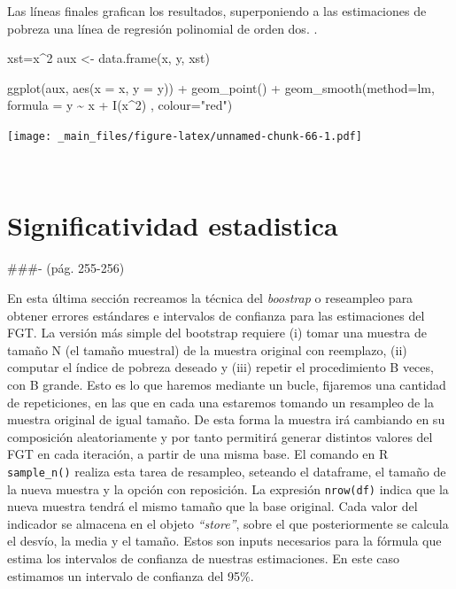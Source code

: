\documentclass[
]{book}
\newenvironment{Shaded}{\begin{snugshade}}{\end{snugshade}}
\newcommand{\AttributeTok}[1]{\textcolor[rgb]{0.77,0.63,0.00}{#1}}
\newcommand{\DecValTok}[1]{\textcolor[rgb]{0.00,0.00,0.81}{#1}}
\newcommand{\FunctionTok}[1]{\textcolor[rgb]{0.00,0.00,0.00}{#1}}
\newcommand{\NormalTok}[1]{#1}
\newcommand{\OtherTok}[1]{\textcolor[rgb]{0.56,0.35,0.01}{#1}}
\newcommand{\SpecialCharTok}[1]{\textcolor[rgb]{0.00,0.00,0.00}{#1}}
\newcommand{\StringTok}[1]{\textcolor[rgb]{0.31,0.60,0.02}{#1}}
\begin{document}
Las líneas finales grafican los resultados, superponiendo a las estimaciones de pobreza una línea de regresión polinomial de orden dos.
.

\begin{Shaded}
\begin{Highlighting}[]
\NormalTok{xst}\OtherTok{=}\NormalTok{x}\SpecialCharTok{\^{}}\DecValTok{2}
\NormalTok{aux }\OtherTok{\textless{}{-}} \FunctionTok{data.frame}\NormalTok{(x, y, xst)}

\FunctionTok{ggplot}\NormalTok{(aux, }\FunctionTok{aes}\NormalTok{(}\AttributeTok{x =}\NormalTok{ x, }\AttributeTok{y =}\NormalTok{ y)) }\SpecialCharTok{+} 
  \FunctionTok{geom\_point}\NormalTok{() }\SpecialCharTok{+} 
\FunctionTok{geom\_smooth}\NormalTok{(}\AttributeTok{method=}\NormalTok{lm, }\AttributeTok{formula =}\NormalTok{ y }\SpecialCharTok{\textasciitilde{}}\NormalTok{ x }\SpecialCharTok{+} \FunctionTok{I}\NormalTok{(x}\SpecialCharTok{\^{}}\DecValTok{2}\NormalTok{) , }\AttributeTok{colour=}\StringTok{"red"}\NormalTok{)}
\end{Highlighting}
\end{Shaded}

\texttt{[image: \_main\_files/figure-latex/unnamed-chunk-66-1.pdf]}

~

\hypertarget{significatividad-estadistica}{%
\section{Significatividad estadistica}\label{significatividad-estadistica}}

\#\#\#- (pág. 255-256)

En esta última sección recreamos la técnica del \emph{boostrap} o reseampleo para obtener errores estándares e intervalos de confianza para las estimaciones del FGT. La versión más simple del bootstrap requiere (i) tomar una muestra de tamaño N (el tamaño muestral) de la muestra original con reemplazo, (ii) computar el índice de pobreza deseado y (iii) repetir el procedimiento B veces, con B grande. Esto es lo que haremos mediante un bucle, fijaremos una cantidad de repeticiones, en las que en cada una estaremos tomando un resampleo de la muestra original de igual tamaño. De esta forma la muestra irá cambiando en su composición aleatoriamente y por tanto permitirá generar distintos valores del FGT en cada iteración, a partir de una misma base. El comando en R \texttt{sample\_n()} realiza esta tarea de resampleo, seteando el dataframe, el tamaño de la nueva muestra y la opción con reposición. La expresión \texttt{nrow(df)} indica que la nueva muestra tendrá el mismo tamaño que la base original. Cada valor del indicador se almacena en el objeto \emph{``store''}, sobre el que posteriormente se calcula el desvío, la media y el tamaño. Estos son inputs necesarios para la fórmula que estima los intervalos de confianza de nuestras estimaciones. En este caso estimamos un intervalo de confianza del 95\%.
\end{document}
